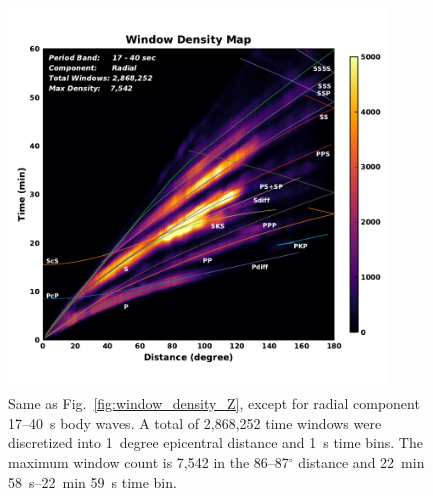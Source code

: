 \documentclass[extra,mreferee]{gji}
\begin{document}
\begin{figure}
  \centering
  \includegraphics[width=0.9\textwidth]{figures/window_colorbar_linear_R.pdf}
  \caption{\small{Same as Fig.~\ref{fig:window_density_Z}, except for radial component 17--40~s body waves.
   A total of 2,868,252 time windows were discretized into 1~degree epicentral distance and 1~s time bins.
  The maximum window count is 7,542 in the 86--87$^\circ$ distance and 22~min 58~s--22~min 59~s time bin.
   }}
  \label{fig:window_density_R}
\end{figure}
\end{document}
